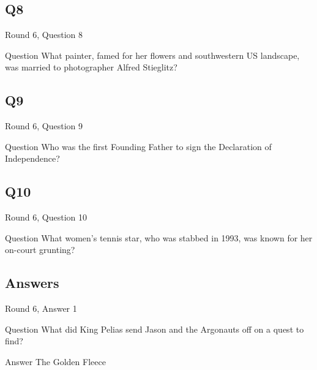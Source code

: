 \documentclass[11pt]{beamer}
\begin{document}
\subsection*{Q8}
\begin{frame}[t]{Round 6, Question 8}
\vspace{2em}
\begin{block}{Question}
What painter, famed for her flowers and southwestern US landscape, was married to photographer Alfred Stieglitz\@?
\end{block}
\end{frame}
    

\subsection*{Q9}
\begin{frame}[t]{Round 6, Question 9}
\vspace{2em}
\begin{block}{Question}
Who was the first Founding Father to sign the Declaration of Independence\@?
\end{block}
\end{frame}
    

\subsection*{Q10}
\begin{frame}[t]{Round 6, Question 10}
\vspace{2em}
\begin{block}{Question}
What women's tennis star, who was stabbed in 1993, was known for her on-court grunting\@?
\end{block}
\end{frame}
    
\subsection{Answers}

\begin{frame}[t]{Round 6, Answer 1}
\vspace{2em}
\begin{block}{Question}
What did King Pelias send Jason and the Argonauts off on a quest to find\@?
\end{block}
\pause{}
\begin{block}{Answer}
The Golden Fleece
\end{block}
\end{frame}
    
\end{document}
